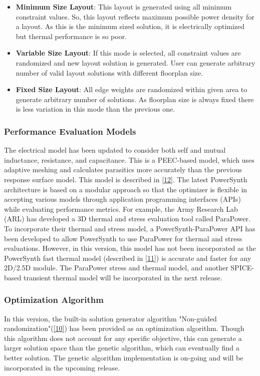 \documentclass[11pt]{article}
\begin{document}
\begin{itemize}
\begin{table}[H]
\end{table}
\begin{itemize}
    \item \textbf{Minimum Size Layout}: This layout is generated using all minimum constraint values. So, this layout reflects maximum possible power density for a layout. As this is the minimum sized solution, it is electrically optimized but thermal performance is so poor.
    \item \textbf{Variable Size Layout}: If this mode is selected, all constraint values are randomized and new layout solution is generated. User can generate arbitrary number of valid layout solutions with different floorplan size.
    \item \textbf{Fixed Size Layout}:  All edge weights are randomized within given area to generate arbitrary number of solutions. As floorplan size is always fixed there is less variation in this mode than the previous one.

\end{itemize}
\end{itemize}

\subsubsection{Performance Evaluation Models}
The electrical model has been updated to consider both self and mutual inductance, resistance, and capacitance. This is a PEEC-based model, which uses adaptive meshing and calculates parasitics more accurately than the previous response surface model. This model is described in \href{./Publications/Q.Le_IWIPP_19.pdf}{[12]}. The latest PowerSynth architecture is based on a modular approach so that the optimizer is flexible in accepting various models through application programming interfaces (APIs) while evaluating performance metrics. For example, the Army Research Lab (ARL) has developed a 3D thermal and stress evaluation tool called ParaPower. To incorporate their thermal and stress model, a PowerSynth-ParaPower API has been developed to allow PowerSynth to use ParaPower for thermal and stress evaluations. However, in this version, this model has not been incorporated as the PowerSynth fast thermal model (described in \href{./Publications/PowerSynth-A_Module_Layout_Generation_Tool.pdf}{[11]}) is accurate and faster for any 2D/2.5D module. The ParaPower stress and thermal model, and another SPICE-based transient thermal model will be incorporated in the next release.

\subsubsection{Optimization Algorithm}
In this version, the built-in solution generator algorithm "Non-guided randomization"(\href{./Publications/WIPDA_2018.pdf}{[10]}) has been provided as an optimization algorithm. Though this algorithm does not account for any specific objective, this can generate a larger solution space than the genetic algorithm, which can eventually find a better solution. The genetic algorithm implementation is on-going and will be incorporated in the upcoming release.
\end{document}
